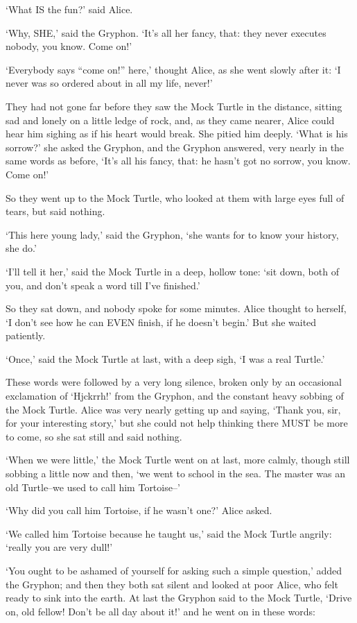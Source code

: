 \documentclass[12pt]{book}
\begin{document}
  `What IS the fun?' said Alice.

  `Why, SHE,' said the Gryphon.  `It's all her fancy, that:  they
never executes nobody, you know.  Come on!'

  `Everybody says ``come on!'' here,' thought Alice, as she went
slowly after it:  `I never was so ordered about in all my life,
never!'

  They had not gone far before they saw the Mock Turtle in the
distance, sitting sad and lonely on a little ledge of rock, and,
as they came nearer, Alice could hear him sighing as if his heart
would break.  She pitied him deeply.  `What is his sorrow?' she
asked the Gryphon, and the Gryphon answered, very nearly in the
same words as before, `It's all his fancy, that:  he hasn't got
no sorrow, you know.  Come on!'

  So they went up to the Mock Turtle, who looked at them with
large eyes full of tears, but said nothing.

  `This here young lady,' said the Gryphon, `she wants for to
know your history, she do.'

  `I'll tell it her,' said the Mock Turtle in a deep, hollow
tone:  `sit down, both of you, and don't speak a word till I've
finished.'

  So they sat down, and nobody spoke for some minutes.  Alice
thought to herself, `I don't see how he can EVEN finish, if he
doesn't begin.'  But she waited patiently.

  `Once,' said the Mock Turtle at last, with a deep sigh, `I was
a real Turtle.'

  These words were followed by a very long silence, broken only
by an occasional exclamation of `Hjckrrh!' from the Gryphon, and
the constant heavy sobbing of the Mock Turtle.  Alice was very
nearly getting up and saying, `Thank you, sir, for your
interesting story,' but she could not help thinking there MUST be
more to come, so she sat still and said nothing.

  `When we were little,' the Mock Turtle went on at last, more
calmly, though still sobbing a little now and then, `we went to
school in the sea.  The master was an old Turtle--we used to call
him Tortoise--'

  `Why did you call him Tortoise, if he wasn't one?' Alice asked.

  `We called him Tortoise because he taught us,' said the Mock
Turtle angrily:  `really you are very dull!'

  `You ought to be ashamed of yourself for asking such a simple
question,' added the Gryphon; and then they both sat silent and
looked at poor Alice, who felt ready to sink into the earth.  At
last the Gryphon said to the Mock Turtle, `Drive on, old fellow!
Don't be all day about it!' and he went on in these words:
\end{document}
